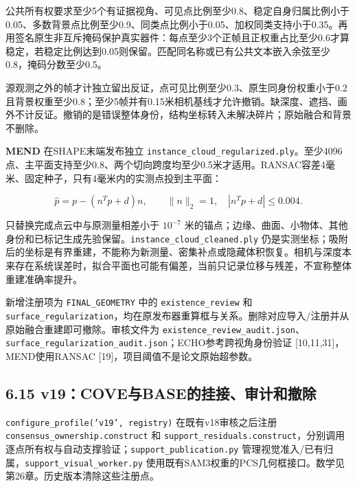 \documentclass[UTF8,fontset=fandol]{ctexart}
\begin{document}
公共所有权要求至少5个有证据视角、可见点比例至少0.8、稳定自身归属比例小于0.05、多数背景点比例至少0.9、同类点比例小于0.05、加权同类支持小于0.35。再用签名原生非互斥掩码保护真实器件：每点至少3个正帧且正权重占比至少0.6才算稳定，若稳定比例达到0.05则保留。匹配同名称或已有公共文本嵌入余弦至少0.8，掩码分数至少0.5。



源观测之外的帧才计独立留出反证，点可见比例至少0.3、原生同身份权重小于0.2且背景权重至少0.8；至少5帧并有0.15米相机基线才允许撤销。缺深度、遮挡、画外不计反证。撤销的是错误整体身份，结构坐标转入未解决碎片；原始融合和背景不删除。



\textbf{MEND} 在SHAPE末端发布独立 \texttt{instance\_\allowbreak{}cloud\_\allowbreak{}regularized.\allowbreak{}ply}。至少4096点、主平面支持至少0.8、两个切向跨度均至少0.5米才适用。RANSAC容差4毫米、固定种子，只有4毫米内的实测点投到主平面：



\[
\widehat p=p-(n^Tp+d)n,\qquad \|n\|_2=1,\quad |n^Tp+d|\le0.004.
\]

只替换完成点云中与原测量相差小于 $10^{-7}$ 米的锚点；边缘、曲面、小物体、其他身份和已标记生成先验保留。\texttt{instance\_\allowbreak{}cloud\_\allowbreak{}cleaned.\allowbreak{}ply} 仍是实测坐标；吸附后的坐标是有界重建，不能称为新测量、密集补点或隐藏体积恢复。相机与深度本来存在系统误差时，拟合平面也可能有偏差，当前只记录位移与残差，不宣称整体重建准确率提升。



新增注册项为 \texttt{FINAL\_\allowbreak{}GEOMETRY} 中的 \texttt{existence\_\allowbreak{}review} 和 \texttt{surface\_\allowbreak{}regularization}，均在原发布器重算框与关系。删除对应导入/注册并从原始融合重建即可撤除。审核文件为 \texttt{existence\_\allowbreak{}review\_\allowbreak{}audit.\allowbreak{}json}、\texttt{surface\_\allowbreak{}regularization\_\allowbreak{}audit.\allowbreak{}json}；ECHO参考跨视角身份验证 [10,11,31]，MEND使用RANSAC [19]，项目阈值不是论文原始超参数。



\subsection*{6.15 v19：COVE与BASE的挂接、审计和撤除}

\texttt{configure\_\allowbreak{}profile('v19', registry)} 在既有v18审核之后注册 \texttt{consensus\_\allowbreak{}ownership.\allowbreak{}construct} 和 \texttt{support\_\allowbreak{}residuals.\allowbreak{}construct}，分别调用逐点所有权与自动支撑验证；\texttt{support\_\allowbreak{}publication.\allowbreak{}py} 管理视觉准入/已有归属，\texttt{support\_\allowbreak{}visual\_\allowbreak{}worker.\allowbreak{}py} 使用既有SAM3权重的PCS几何框接口。数学见第26章。历史版本清除这些注册点。
\end{document}

